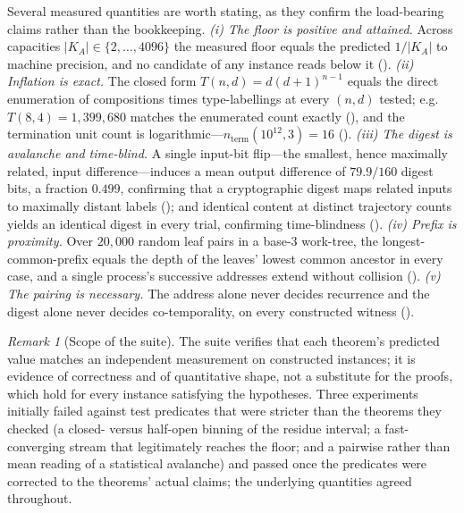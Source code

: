 \documentclass[twocolumn,10pt,a4paper]{article}
\theoremstyle{thmstyle}
\theoremstyle{definition}
\theoremstyle{remark}
\newtheorem{remark}[theorem]{Remark}
\newcommand{\abs}[1]{\lvert#1\rvert}
\begin{document}
Several measured quantities are worth stating, as they confirm the
load-bearing claims rather than the bookkeeping. \emph{(i) The floor is
positive and attained.} Across capacities $\abs{K_A}\in\{2,\dots,4096\}$
the measured floor equals the predicted $1/\abs{K_A}$ to machine
precision, and no candidate of any instance reads below it
(). \emph{(ii) Inflation is exact.} The closed form
$T(n,d)=d(d+1)^{n-1}$ equals the direct enumeration of compositions times
type-labellings at every $(n,d)$ tested; e.g.\ $T(8,4)=1{,}399{,}680$
matches the enumerated count exactly (), and the
termination unit count is logarithmic---$n_{\mathrm{term}}(10^{12},3)=16$
(). \emph{(iii) The digest is avalanche and
time-blind.} A single input-bit flip---the smallest, hence maximally
related, input difference---induces a mean output difference of
$79.9/160$ digest bits, a fraction $0.499$, confirming that a
cryptographic digest maps related inputs to maximally distant labels
(); and identical content at distinct trajectory
counts yields an identical digest in every trial, confirming
time-blindness (). \emph{(iv) Prefix is proximity.}
Over $20{,}000$ random leaf pairs in a base-$3$ work-tree, the
longest-common-prefix equals the depth of the leaves' lowest common
ancestor in every case, and a single process's successive addresses
extend without collision (). \emph{(v) The pairing is
necessary.} The address alone never decides recurrence and the digest
alone never decides co-temporality, on every constructed witness
().



\begin{remark}[Scope of the suite]
\label{rem:val-scope}
The suite verifies that each theorem's predicted value matches an
independent measurement on constructed instances; it is evidence of
correctness and of quantitative shape, not a substitute for the proofs,
which hold for every instance satisfying the hypotheses. Three
experiments initially failed against test predicates that were stricter
than the theorems they checked (a closed- versus half-open binning of the
residue interval; a fast-converging stream that legitimately reaches the
floor; and a pairwise rather than mean reading of a statistical avalanche)
and passed once the predicates were corrected to the theorems' actual
claims; the underlying quantities agreed throughout.
\end{remark}
\end{document}
